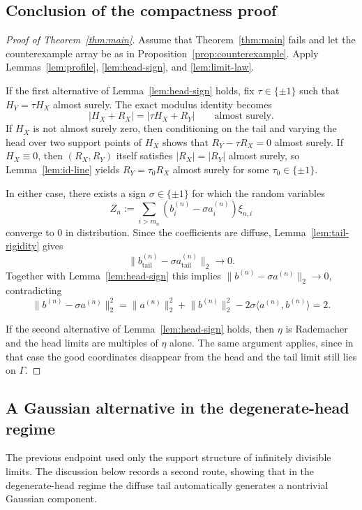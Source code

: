 \documentclass[11pt]{amsart}
\numberwithin{equation}{section}
\theoremstyle{definition}
\theoremstyle{remark}
\newcommand{\abs}[1]{\lvert #1 \rvert}
\newcommand{\norm}[1]{\lVert #1 \rVert}
\newcommand{\ip}[2]{\langle #1,#2\rangle}
\begin{document}
\subsection{Conclusion of the compactness proof}

\begin{proof}[Proof of Theorem~\ref{thm:main}]
Assume that Theorem~\ref{thm:main} fails and let the counterexample array be as
in Proposition~\ref{prop:counterexample}.  Apply
Lemmas~\ref{lem:profile}, \ref{lem:head-sign}, and \ref{lem:limit-law}.

If the first alternative of Lemma~\ref{lem:head-sign} holds, fix
$\tau\in\{\pm1\}$ such that $H_Y=\tau H_X$ almost surely.  The exact modulus
identity becomes
\[
\abs{H_X+R_X}=\abs{\tau H_X+R_Y}
\qquad\text{almost surely.}
\]
If $H_X$ is not almost surely zero, then conditioning on the tail and varying
the head over two support points of $H_X$ shows that
$R_Y-\tau R_X=0$ almost surely.  If $H_X\equiv0$, then
$(R_X,R_Y)$ itself satisfies $\abs{R_X}=\abs{R_Y}$ almost surely, so
Lemma~\ref{lem:id-line} yields
$R_Y=\tau_0 R_X$ almost surely for some $\tau_0\in\{\pm1\}$.

In either case, there exists a sign $\sigma\in\{\pm1\}$ for which the random variables
\[
Z_n:=\sum_{i>m_n}(b_i^{(n)}-\sigma a_i^{(n)})\xi_{n,i}
\]
converge to $0$ in distribution.  Since the coefficients are diffuse,
Lemma~\ref{lem:tail-rigidity} gives
\[
\norm{b_{\mathrm{tail}}^{(n)}-\sigma a_{\mathrm{tail}}^{(n)}}_2\to0.
\]
Together with Lemma~\ref{lem:head-sign} this implies
$\norm{b^{(n)}-\sigma a^{(n)}}_2\to0$, contradicting
\[
\norm{b^{(n)}-\sigma a^{(n)}}_2^2
=\norm{a^{(n)}}_2^2+\norm{b^{(n)}}_2^2
-2\sigma\ip{a^{(n)}}{b^{(n)}}=2.
\]

If the second alternative of Lemma~\ref{lem:head-sign} holds, then
$\eta$ is Rademacher and the head limits are multiples of $\eta$ alone.  The
same argument applies, since in that case the good coordinates disappear from
the head and the tail limit still lies on $\Gamma$.
\end{proof}

\subsection{A Gaussian alternative in the degenerate-head regime}

The previous endpoint used only the support structure of infinitely divisible
limits.  The discussion below records a second route, showing that in the degenerate-head regime the
diffuse tail automatically generates a nontrivial Gaussian component.
\end{document}
